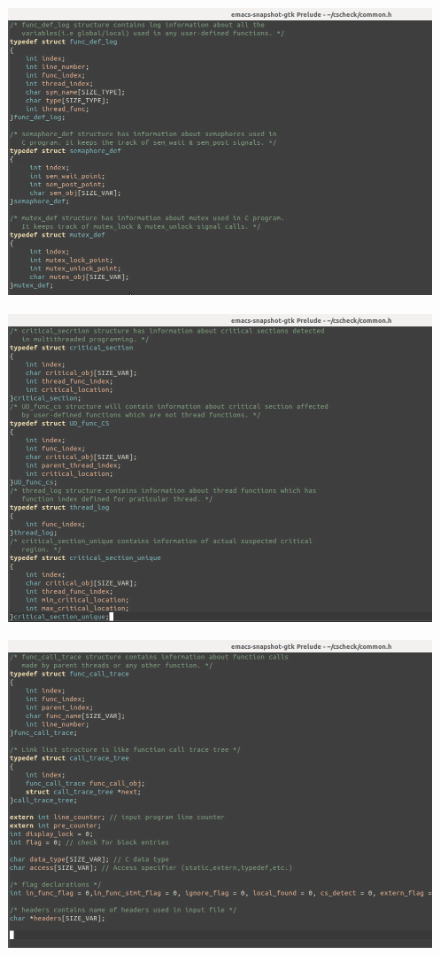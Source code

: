\begin{figure}[H]
\centering
\includegraphics[scale=0.4]{Snaps/common_3.png}
\label{<<Label>>}
\end{figure}

\begin{figure}[H]
\centering
\includegraphics[scale=0.4]{Snaps/common_4.png}
\label{<<Label>>}
\end{figure}

\begin{figure}[H]
\centering
\includegraphics[scale=0.4]{Snaps/common_5.png}
\label{<<Label>>}
\end{figure}

